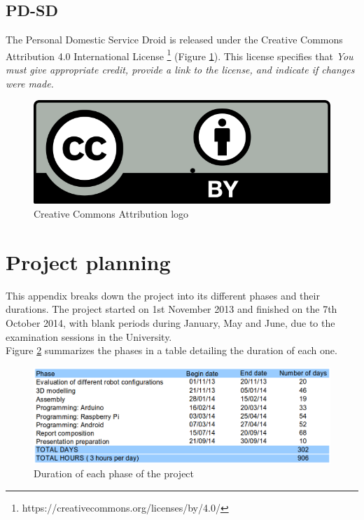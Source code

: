 	\subsection{PD-SD}The Personal Domestic Service Droid is released under the Creative Commons Attribution 4.0 International License \footnote{https://creativecommons.org/licenses/by/4.0/} (Figure \ref{ccby}). This license specifies that \textit{You must give appropriate credit, provide a link to the license, and indicate if changes were made.}\\


	    \begin{figure}[H]
			\centering
	      	\includegraphics[scale=0.2]{images/ccby}  
	      	\caption{Creative Commons Attribution logo }
			\label{ccby}
		\end{figure}
		









\newpage
\section{Project planning} \label{app:gantt}

This appendix breaks down the project into its different phases and their durations. The project started on 1st November 2013 and finished on the 7th October 2014, with blank periods during January, May and June, due to the examination sessions in the University.  \\

Figure \ref{Ganttresumen} summarizes the phases in a table detailing the duration of each one.
 

	\begin{figure}[H]
	\centering
   	\includegraphics[width=15.5cm]{appendices/Planificacion-Resumen.png} 
   	\caption{Duration of each phase of the project }
	\label{Ganttresumen}
	\end{figure}	


